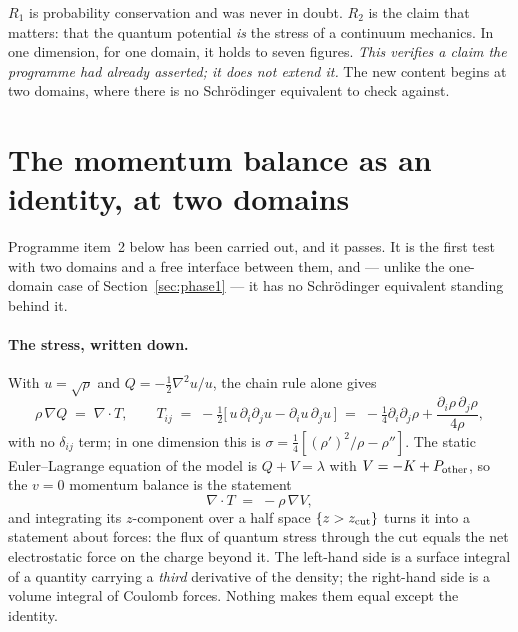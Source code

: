 \documentclass[11pt]{article}
\newcommand{\grad}{\nabla}
\begin{document}
$R_1$ is probability conservation and was never in doubt. $R_2$ is the claim that matters: that the
quantum potential \emph{is} the stress of a continuum mechanics. In one dimension, for one domain,
it holds to seven figures. \emph{This verifies a claim the programme had already asserted; it does
not extend it.} The new content begins at two domains, where there is no Schr\"odinger equivalent to
check against.

\section{The momentum balance as an identity, at two domains}\label{sec:phase2}

Programme item~2 below has been carried out, and it passes. It is the first test with two domains
and a free interface between them, and --- unlike the one-domain case of Section~\ref{sec:phase1} --- it has no Schr\"odinger equivalent
standing behind it.

\paragraph{The stress, written down.} With $u=\sqrt\rho$ and $Q=-\tfrac12\grad^2u/u$, the chain rule
alone gives
\begin{equation}\label{eq:stress}
\rho\,\grad Q \;=\; \grad\cdot T,\qquad
T_{ij} \;=\; -\tfrac12\big[\,u\,\partial_i\partial_j u - \partial_i u\,\partial_j u\,\big]
\;=\; -\tfrac14\partial_i\partial_j\rho + \frac{\partial_i\rho\,\partial_j\rho}{4\rho},
\end{equation}
with no $\delta_{ij}$ term; in one dimension this is $\sigma=\tfrac14[(\rho')^2/\rho-\rho'']$. The
static Euler--Lagrange equation of the model is $Q+V=\lambda$ with $V=-K+P_{\rm other}$, so the
$v=0$ momentum balance is the statement
\begin{equation}\label{eq:divT}
\grad\cdot T \;=\; -\rho\,\grad V ,
\end{equation}
and integrating its $z$-component over a half space $\{z>z_{\rm cut}\}$ turns it into a statement
about forces: the flux of quantum stress through the cut equals the net electrostatic force on the
charge beyond it. The left-hand side is a surface integral of a quantity carrying a \emph{third}
derivative of the density; the right-hand side is a volume integral of Coulomb forces. Nothing makes
them equal except the identity.
\end{document}
